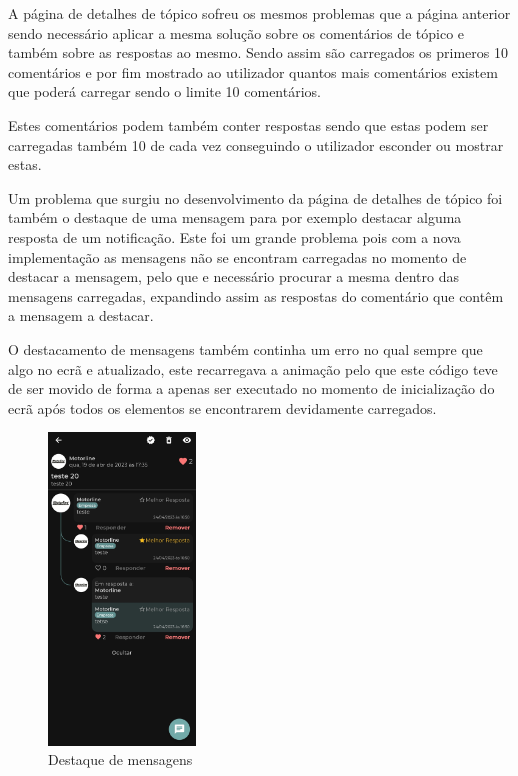 A página de detalhes de tópico sofreu os mesmos problemas que a página anterior sendo necessário aplicar a mesma solução sobre os comentários de tópico e também sobre as respostas ao mesmo. Sendo assim são carregados os primeros 10 comentários e por fim mostrado ao utilizador quantos mais comentários existem que poderá carregar sendo o limite 10 comentários.

Estes comentários podem também conter respostas sendo que estas podem ser carregadas também 10 de cada vez conseguindo o utilizador esconder ou mostrar estas.

Um problema que surgiu no desenvolvimento da página de detalhes de tópico foi também o destaque de uma mensagem para por exemplo destacar alguma resposta de um notificação. Este foi um grande problema pois com a nova implementação as mensagens não se encontram carregadas no momento de destacar a mensagem, pelo que e necessário procurar a mesma dentro das mensagens carregadas, expandindo assim as respostas do comentário que contêm a mensagem a destacar.

O destacamento de mensagens também continha um erro no qual sempre que algo no ecrã e atualizado, este recarregava a animação pelo que este código teve de ser movido de forma a apenas ser executado no momento de inicialização do ecrã após todos os elementos se encontrarem devidamente carregados.

\begin{figure}[htb]
  \centering
  \includegraphics[width=0.35\textwidth]{images/implementacao/frontend/forum/loading_topics/1686062701127.jpg}
  \caption{Destaque de mensagens}
  \label{fig:74}
\end{figure}